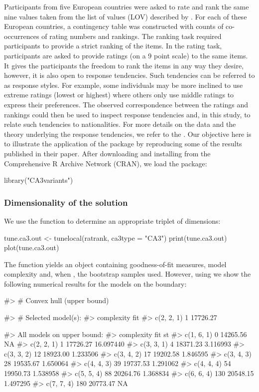 Participants from five European countries were asked to rate and rank the same nine values taken from the list of values (LOV) described by \citet{kah83}. For each of these European countries, a contingency table was constructed with counts of co-occurrences of rating numbers and rankings. The ranking task required participants to provide a strict ranking of the items. In the rating task, participants are asked to provide ratings (on a 9 point scale) to the same items. It gives the participants the freedom to rank the items in any way they desire, however,  it is also open to response tendencies.  Such tendencies can be referred to as response styles. For example,  some individuals may be more inclined to use extreme ratings (lowest or highest) where others only use middle ratings to express their preferences. The observed correspondence between the ratings and rankings could then be used to inspect response tendencies and, in this study, to relate such tendencies to nationalities. For more details on the data and the theory underlying the response tendencies, we refer to the \cite{vel07}. Our objective here is to illustrate the application of the  package by reproducing some of the results published in their paper.  
After downloading and installing  from the Comprehensive R Archive Network (CRAN), we load the package:
\begin{example}
 library("CA3variants")
\end{example}

\subsubsection{Dimensionality of the solution}

We use the  function to determine an appropriate triplet of dimensions:

\begin{example}
 tune.ca3.out <- tunelocal(ratrank, ca3type = "CA3")
 print(tune.ca3.out)
 plot(tune.ca3.out)
\end{example}
The function  yields an object containing goodness-of-fit measures, model complexity and, when , the bootstrap samples used. However, using  we show the following numerical results  for the models  on the boundary:

\begin{example}
#> # Convex hull (upper bound)

#> # Selected model(s):
#>           complexity      fit
#> c(2, 2, 1)          1 17726.27


#> All models on upper bound:
#>            complexity      fit        st
#> c(1, 6, 1)          0 14265.56        NA
#> c(2, 2, 1)          1 17726.27 16.097440
#> c(3, 3, 1)          4 18371.23  3.116993
#> c(3, 3, 2)         12 18923.00  1.233506
#> c(3, 4, 2)         17 19202.58  1.846595
#> c(3, 4, 3)         28 19535.67  1.650064
#> c(4, 4, 3)         39 19737.53  1.291062
#> c(4, 4, 4)         54 19950.73  1.538958
#> c(5, 5, 4)         88 20264.76  1.368834
#> c(6, 6, 4)        130 20548.15  1.497295
#> c(7, 7, 4)        180 20773.47        NA
\end{example}


